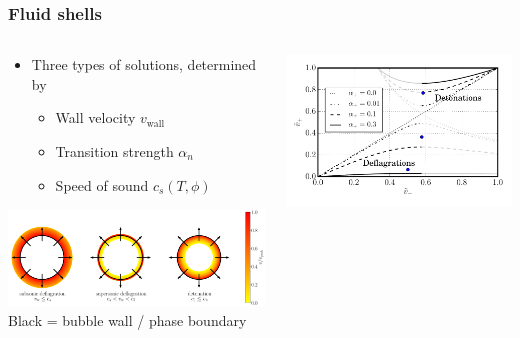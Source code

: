 \begin{frame}
    \frametitle{Fluid shells}
    \begin{columns}
    \begin{column}{0.6\textwidth}
        \begin{itemize}
            \item Three types of solutions, determined by
            \begin{itemize}
                \item Wall velocity $v_\text{wall}$
                \item Transition strength $\alpha_n$
                \item Speed of sound $c_s(T,\phi)$
            \end{itemize}
        \end{itemize}
        \includegraphics[width=\textwidth]{../fig/all_circle} \\
        {\footnotesize Black = bubble wall / phase boundary}
    \end{column}
    \begin{column}{0.4\textwidth}
        \includegraphics[width=\textwidth]{../fig/vplusvminus}
    \end{column}
    \end{columns}
\end{frame}

